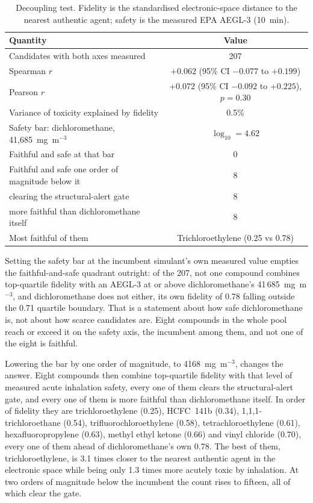 \documentclass[journal=jacsat,manuscript=suppinfo,margin=1in]{achemso}
\begin{document}
\begin{table}[!htb]
\centering
\caption{Decoupling test. Fidelity is the standardised electronic-space distance to
the nearest authentic agent; safety is the measured EPA AEGL-3 (10~min).}
\label{tab:h1}
\small
\begin{tabular}{lc}
\hline
Quantity & Value \\
\hline
Candidates with both axes measured & 207 \\
Spearman $r$ & $+0.062$ (95\% CI $-0.077$ to $+0.199$) \\
Pearson $r$ & $+0.072$ (95\% CI $-0.092$ to $+0.225$), $p = 0.30$ \\
Variance of toxicity explained by fidelity & 0.5\% \\
\hline
Safety bar: dichloromethane, 41,685~mg~m$^{-3}$ & $\log_{10} = 4.62$ \\
Faithful and safe at that bar & 0 \\
Faithful and safe one order of magnitude below it & 8 \\
\quad clearing the structural-alert gate & 8 \\
\quad more faithful than dichloromethane itself & 8 \\
Most faithful of them & Trichloroethylene (0.25 vs 0.78) \\
\hline
\end{tabular}
\end{table}

Setting the safety bar at the incumbent simulant's own measured value empties the
faithful-and-safe quadrant outright: of the 207, not one compound combines
top-quartile fidelity with an AEGL-3 at or above dichloromethane's
41\,685~mg~m$^{-3}$, and dichloromethane does not either, its own fidelity of
0.78 falling outside the 0.71 quartile boundary. That is a statement
about how safe dichloromethane is, not about how scarce candidates are. Eight
compounds in the whole pool reach or exceed it on the safety axis, the incumbent
among them, and not one of the eight is faithful.

Lowering the bar by one order of magnitude, to 4168~mg~m$^{-3}$, changes the
answer. Eight compounds then combine top-quartile fidelity with that level of
measured acute inhalation safety, every one of them clears the structural-alert
gate, and every one of them is more faithful than dichloromethane itself. In
order of fidelity they are trichloroethylene (0.25), HCFC~141b (0.34),
1,1,1-trichloroethane (0.54), trifluorochloroethylene (0.58),
tetrachloroethylene (0.61), hexafluoropropylene (0.63), methyl ethyl ketone
(0.66) and vinyl chloride (0.70), every one of them ahead of dichloromethane's
own 0.78. The best of them,
trichloroethylene, is 3.1 times closer to the nearest authentic agent in the
electronic space while being only 1.3 times more acutely toxic by inhalation. At
two orders of magnitude below the incumbent the count rises to fifteen, all of
which clear the gate.
\end{document}

